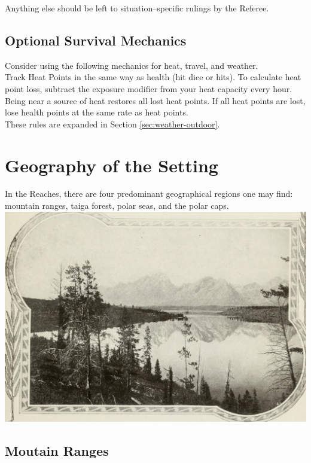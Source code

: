 \documentclass[notitlepage]{article}
\begin{document}
\begin{multicols*}{2}
Anything else should be left to situation--specific rulings by the Referee.

\subsection*{Optional Survival Mechanics}

Consider using the following mechanics for heat, travel, and weather. \\

Track Heat Points in the same way as health (hit dice or hits).
To calculate heat point loss, subtract the exposure modifier from your heat capacity every hour.
Being near a source of heat restores all lost heat points.
If all heat points are lost, lose health points at the same rate as heat points. \\

These rules are expanded in Section \ref{sec:weather-outdoor}.

\section{Geography of the Setting}

In the Reaches, there are four predominant geographical regions one may find: mountain ranges, taiga forest, polar seas, and the polar caps. \\

{\centering
\includegraphics[width=\columnwidth]{geography-mountains}
}


\subsection*{Moutain Ranges}


\end{multicols*}
\end{document}
